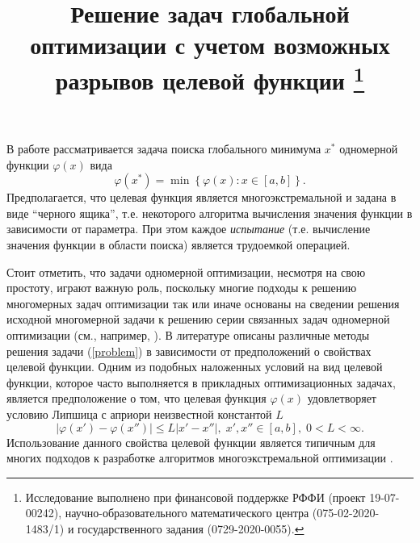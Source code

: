 \documentclass[11pt, oneside, a4paper]{article}
\begin{document}
\setcounter{page}{1}



\title{
Решение задач глобальной оптимизации с учетом возможных разрывов целевой функции
\footnote{Исследование выполнено при финансовой поддержке РФФИ (проект 19-07-00242), научно-образовательного математического центра (075-02-2020-1483/1) и государственного задания (0729-2020-0055).}
}





\bigskip

В работе рассматривается задача поиска глобального минимума $x^*$ одномерной функции $\varphi(x)$ вида
\begin{equation}\label{problem}
\varphi(x^*)=\min\left\{\varphi(x):x\in\left[a,b\right]\right\}.
\end{equation}
Предполагается, что целевая функция является многоэкстремальной и задана в виде ``черного ящика'', т.е. некоторого алгоритма вычисления значения функции в зависимости от параметра. При этом каждое \textit{испытание} (т.е. вычисление значения функции в области поиска) является трудоемкой операцией.  

Стоит отметить, что задачи одномерной оптимизации, несмотря на свою простоту, играют важную роль, поскольку многие подходы к решению многомерных задач оптимизации так или иначе основаны на сведении решения исходной многомерной задачи к решению серии связанных задач одномерной оптимизации (см., например, \cite{Grishagin2007,Sergeyev2008}).
В литературе описаны различные методы решения задачи (\ref{problem}) в зависимости от предположений о свойствах целевой функции. Одним из подобных наложенных условий на вид целевой функции, которое часто выполняется в прикладных оптимизационных задачах, является предположение о том, что целевая функция $\varphi(x)$ удовлетворяет условию Липшица с априори неизвестной константой $L$
\[
\left|\varphi(x')-\varphi(x'')\right|\leq L\left|x'-x''\right|,\; x',x'' \in [a,b],\; 0<L<\infty.
\]
Использование данного свойства целевой функции является типичным для многих подходов к разработке алгоритмов многоэкстремальной оптимизации \cite{Evtushenko2009,Elsakov}. 
\end{document}
